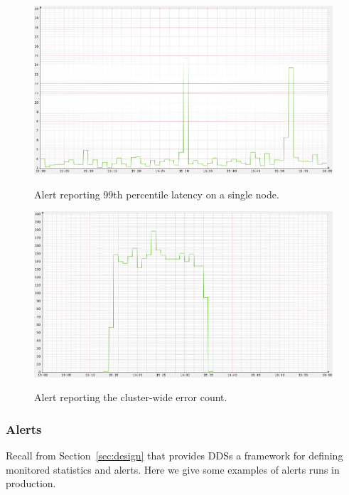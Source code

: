 \begin{figure}[t]
  \begin{minipage}[t]{0.48\textwidth}
    {\includegraphics[width=0.99\textwidth]{expr/alert_graphs/latency99th_app74_alert_value.png}}
    \vspace*{-2ex}
    \caption{\label{fig:latency_alert} Alert reporting 99th percentile latency
on a single \ES node.}
  \end{minipage}
  \hfill
  \begin{minipage}[t]{0.48\textwidth}
    {\includegraphics[width=0.99\textwidth]{expr/alert_graphs/errorcount_sumeach_alert_val.png}}
    \vspace*{-2ex}
    \caption{\label{fig:error_alert} Alert reporting the cluster-wide \ES error count.}
    \end{minipage}
    \vspace*{-2ex}
\end{figure}

\subsubsection{Alerts}
%
Recall from Section~\ref{sec:design} that \helix provides DDSs a framework for
defining monitored statistics and alerts.  Here we give some examples of alerts
\ES runs in production.

